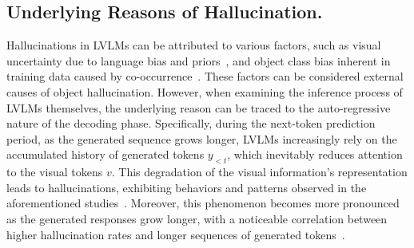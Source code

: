 \subsection{Underlying Reasons of Hallucination.}
Hallucinations in LVLMs can be attributed to various factors, such as visual uncertainty due to language bias and priors~\cite{leng2024mitigating, favero2024multi}, and object class bias inherent in training data caused by co-occurrence~\cite{biten2022let, zhou2024analyzing}. 
%
These factors can be considered external causes of object hallucination. However, when examining the inference process of LVLMs themselves, the underlying reason can be traced to the auto-regressive nature of the decoding phase. 
%
Specifically, during the next-token prediction period, as the generated sequence grows longer, LVLMs increasingly rely on the accumulated history of generated tokens $y_{<t}$, which inevitably reduces attention to the visual tokens $v$.
This degradation of the visual information's representation leads to hallucinations, exhibiting behaviors and patterns observed in the aforementioned studies~\cite{zhou2024analyzing, leng2024mitigating}. Moreover, this phenomenon becomes more pronounced as the generated responses grow longer, with a noticeable correlation between higher hallucination rates and longer sequences of generated tokens~\cite{chen2024halc, huang2024opera}.
